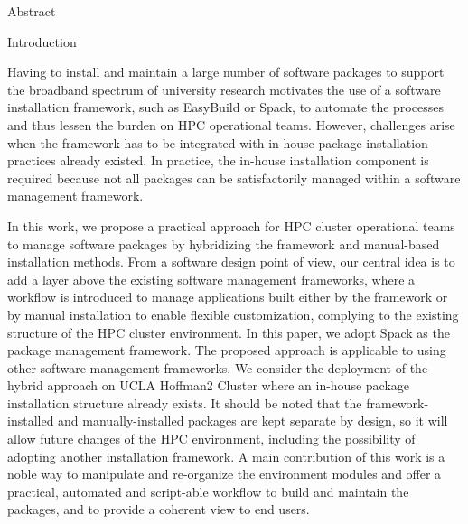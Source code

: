 \documentclass[final]{beamer}
\newlength{\onecolwid}
\begin{document}
\begin{frame}[t]
\begin{columns}[t]
\begin{column}{\onecolwid}
\begin{alertblock}{Abstract}
\end{alertblock}


\begin{block}{Introduction}

\hspace{2em}Having to install and maintain a large number of software packages to support the broadband spectrum of university research motivates the use of a software installation framework, such as EasyBuild\cite{geimer:14} or Spack\cite{gamblin:15}, to automate the processes and thus lessen the burden on HPC operational teams. 
However, challenges arise when the framework has to be integrated with in-house package installation practices already existed. In practice, the in-house installation component is required because not all packages can be satisfactorily managed within a software management framework.

\hspace{2em}In this work, we propose a practical approach for HPC cluster operational teams to manage software packages by hybridizing the framework and manual-based installation methods. 
From a software design point of view, our central idea is to add a layer above the existing software management frameworks, where a workflow is introduced to manage applications built either by the framework or by manual installation to enable flexible customization, complying to the existing structure of the HPC cluster environment.
In this paper, we adopt Spack as the package management framework. The proposed approach is applicable to using other software management frameworks. We consider the deployment of the hybrid approach on UCLA Hoffman2 Cluster where an in-house package installation structure already exists.
It should be noted that the framework-installed and manually-installed packages are kept separate by design, so it will allow future changes of the HPC environment, including the possibility of adopting another installation framework.
A main contribution of this work is a noble way to manipulate and re-organize the environment modules and offer a practical, automated and script-able workflow to build and maintain the packages, and to provide a coherent view to end users.

\end{block}


\end{column}
\end{columns}
\end{frame}
\end{document}
